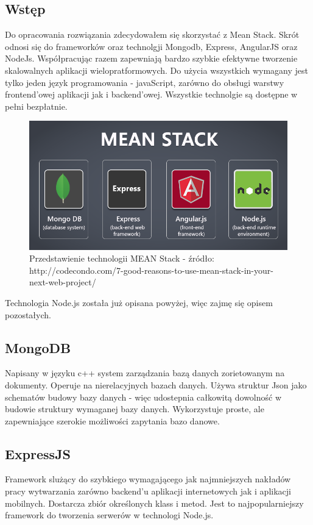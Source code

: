 \documentclass[12pt]{report}
\begin{document}
\subsection{Wstęp}
Do opracowania rozwiązania zdecydowałem się skorzystać z Mean Stack. 
Skrót odnosi się do frameworków oraz technolgji Mongodb, Express, AngularJS oraz NodeJs. 
Współpracując razem zapewniają bardzo szybkie efektywne tworzenie skalowalnych aplikacji wielopratformowych. 
Do użycia wszystkich wymagany jest tylko jeden język programowania - javaScript, zarówno do obsługi warstwy frontend'owej aplikacji jak i backend'owej. 
Wszystkie technolgie są dostępne w pełni bezpłatnie. 
\begin{figure}[!hb]
\centering
\includegraphics[width=\textwidth,height=\textheight,keepaspectratio]{meanStack.png} 
\caption{Przedstawienie technologii MEAN Stack - źródło: http://codecondo.com/7-good-reasons-to-use-mean-stack-in-your-next-web-project/}
\end{figure}

Technologia Node.js została już opisana powyżej, więc zajmę się opisem pozostałych.

\subsection{MongoDB}
Napisany w języku c++ system zarządzania bazą danych zorietowanym na dokumenty. 
Operuje na nierelacyjnych bazach danych. 
Używa struktur Json jako schematów budowy bazy danych - więc udostepnia całkowitą dowolność w budowie struktury wymaganej bazy danych. 
Wykorzystuje proste, ale zapewniające szerokie możliwości zapytania bazo danowe.

\subsection{ExpressJS }
Framework slużący do szybkiego wymagającego jak najmniejszych nakładów pracy wytwarzania zarówno backend’u aplikacji internetowych jak i aplikacji mobilnych.
Dostarcza zbiór określonych klass i metod. Jest to najpopularniejszy framework do tworzenia serwerów w technologi Node.js.
\end{document}
